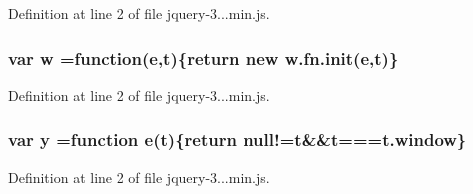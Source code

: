Definition at line 2 of file jquery-\/3...\+min.\+js.

\subsubsection[{w}]{\setlength{\rightskip}{0pt plus 5cm}var w =function({\bf e},{\bf t})\{return new w.\+fn.\+init({\bf e},{\bf t})\}}\label{jquery-3_83_81_8min_8js_a9721a992655f700bdc2e91ba68b71e26}


Definition at line 2 of file jquery-\/3...\+min.\+js.

\subsubsection[{y}]{\setlength{\rightskip}{0pt plus 5cm}var y =function {\bf e}({\bf t})\{return null!={\bf t}\&\&{\bf t}===t.\+window\}}\label{jquery-3_83_81_8min_8js_a0b31909b1cae9ed1db6ff042057fce60}


Definition at line 2 of file jquery-\/3...\+min.\+js.

